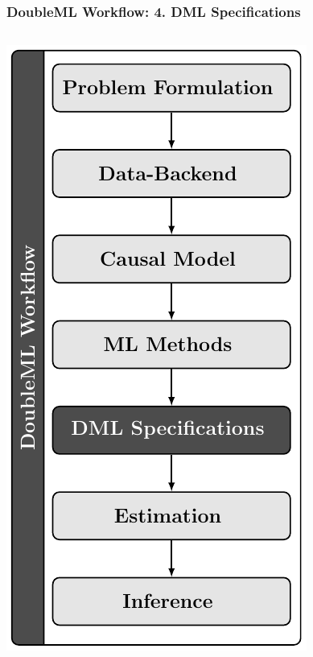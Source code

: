 \begin{frame}[fragile]
\frametitle{DoubleML Workflow: 4. DML Specifications}
\begin{columns}
\begin{column}{0.3\textwidth}
\includegraphics[width = \textwidth]{workflow/doubleml_workflow_dml.pdf}

\end{column}
\end{columns}
\end{frame}
